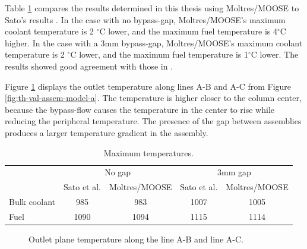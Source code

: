 Table \ref{tab:th-val-assem-results} compares the results determined in this thesis using Moltres/MOOSE to Sato's results \cite{sato_computational_2010}.
In the case with no bypass-gap, Moltres/MOOSE's maximum coolant temperature is 2 $^{\circ}$C lower, and the maximum fuel temperature is 4$^{\circ}$C higher.
In the case with a 3mm bypass-gap, Moltres/MOOSE's maximum coolant temperature is 2 $^{\circ}$C lower, and the maximum fuel temperature is 1$^{\circ}$C lower.
The results showed good agreement with those in \cite{sato_computational_2010}.

Figure \ref{fig:th-val-assem-temps} displays the outlet temperature along lines A-B and A-C from Figure \ref{fig:th-val-assem-model-a}.
The temperature is higher closer to the column center, because the bypass-flow causes the temperature in the center to rise while reducing the peripheral temperature.
The presence of the gap between assemblies produces a larger temperature gradient in the assembly.

\begin{table}[htbp!]
  \centering
  \caption{Maximum temperatures.}
  \label{tab:th-val-assem-results}
\begin{tabular}{l|c|c|c|c}
\toprule
        & \multicolumn{2}{c|}{No gap} & \multicolumn{2}{c}{3mm gap} \\ \cline{2-5}
        & Sato et al. & Moltres/MOOSE & Sato et al. & Moltres/MOOSE \\ \midrule
Bulk coolant & 985     & 983               & 1007     & 1005             \\  
Fuel    & 1090    & 1094              & 1115     & 1114             \\
\bottomrule
\end{tabular}
\end{table}

\begin{figure}[htbp!]
  \centering
  \hfill
  \caption{Outlet plane temperature along the line A-B and line A-C.}
  \label{fig:th-val-assem-temps}
\end{figure}

